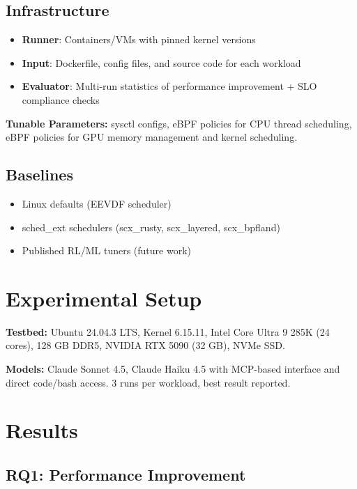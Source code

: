 \documentclass{article}
\begin{document}
\subsection{Infrastructure}

\begin{itemize}[nosep]
    \item \textbf{Runner}: Containers/VMs with pinned kernel versions
    \item \textbf{Input}: Dockerfile, config files, and source code for each workload
    \item \textbf{Evaluator}: Multi-run statistics of performance improvement + SLO compliance checks
\end{itemize}

\textbf{Tunable Parameters:} sysctl configs, eBPF policies for CPU thread scheduling, eBPF policies for GPU memory management and kernel scheduling.

\subsection{Baselines}

\begin{itemize}[nosep]
    \item Linux defaults (EEVDF scheduler)
    \item sched\_ext schedulers (scx\_rusty, scx\_layered, scx\_bpfland)
    \item Published RL/ML tuners (future work)
\end{itemize}

\section{Experimental Setup}

\textbf{Testbed:} Ubuntu 24.04.3 LTS, Kernel 6.15.11, Intel Core Ultra 9 285K (24 cores), 128 GB DDR5, NVIDIA RTX 5090 (32 GB), NVMe SSD.

\textbf{Models:} Claude Sonnet 4.5, Claude Haiku 4.5 with MCP-based interface and direct code/bash access. 3 runs per workload, best result reported.

\section{Results}

\subsection{RQ1: Performance Improvement}
\end{document}
